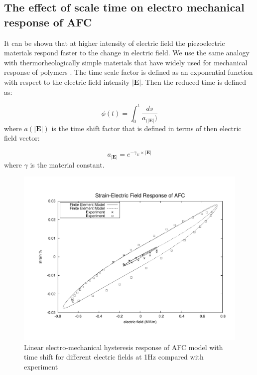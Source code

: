 \subsection{The effect of scale time on electro mechanical response of AFC}
It can be shown that at higher intensity of electric field the piezoelectric materials respond faster to the change in electric field.
We use the same analogy with thermorheologically simple materials that have widely used for mechanical response of polymers \cite{haj2004numerical, tscharnuter2012nonlinear}.
The time scale factor is defined as an exponential function with respect to the electric field intensity $|\textbf {E}|$.
Then the reduced time is defined as:


\begin{equation}
	\phi(t) = \int_0^t \frac{ ds } { a_{( |\textbf {E}| } ) } 
\label{equation:time_scaling}	
\end{equation}
where ${a(|\textbf {E}|)}$ is the time shift factor that is defined in terms of then electric field vector:
 
\begin{equation}
a_{ |\textbf {E}| }=e^{-\gamma_{E} \times |\textbf {E}|}
\label{equation:time_scaling_factor}	
\end{equation}
where $\gamma$ is the material constant.
\begin{figure} 
\centering
\includegraphics[trim = 0mm 0mm 0mm 0mm,width=5.0in]
{./chap_4_structural_analyses/afc_unit_cell/linear_hysteris_time_shift_afc/time_shift_afc_electric_field_vs_strains.pdf}
\caption{Linear electro-mechanical hysteresis response of AFC model with time shift for different electric fields at 1Hz compared with experiment}
\label{fig:time_shift_afc_electric_field_vs_strains}
\end{figure}

